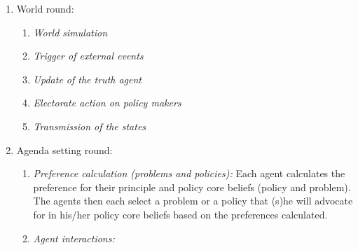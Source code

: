 \begin{enumerate}
\item World round:
	
	\begin{enumerate}
	\item \emph{World simulation}
	\item \emph{Trigger of external events}
	\item \emph{Update of the truth agent}
	\item \emph{Electorate action on policy makers}
	\item \emph{Transmission of the states}
	\end{enumerate}
	
\item Agenda setting round:

	\begin{enumerate}
	\item \emph{Preference calculation (problems and policies):} Each agent calculates the preference for their principle and policy core beliefs (policy and problem). The agents then each select a problem or a policy that (s)he will advocate for in his/her policy core beliefs based on the preferences calculated.
	\item \emph{Agent interactions:} 


\end{enumerate}
\end{enumerate}

